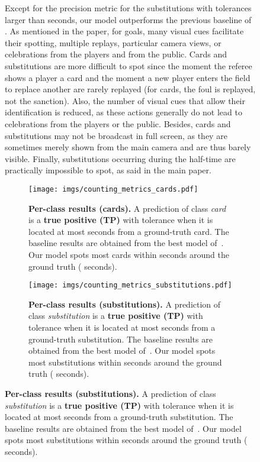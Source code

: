 \documentclass[10pt,twocolumn,letterpaper]{article}
\begin{document}
\begin{figure}[t]
{\begin{minipage}{\linewidth}
Except for the precision metric for the substitutions with tolerances larger than  seconds, our model outperforms the previous baseline of \SoccerNet. As mentioned in the paper, for goals, many visual cues facilitate their spotting, \eg multiple replays, particular camera views, or celebrations from the players and from the public. Cards and substitutions are more difficult to spot since the moment the referee shows a player a card and the moment a new player enters the field to replace another are rarely replayed (\eg for cards, the foul is replayed, not the sanction). Also, the number of visual cues that allow their identification is reduced, as these actions generally do not lead to celebrations from the players or the public. Besides, cards and substitutions may not be broadcast in full screen, as they are sometimes merely shown from the main camera and are thus barely visible. Finally, substitutions occurring during the half-time are practically impossible to spot, as said in the main paper.

\begin{figure}
    \centering
    \texttt{[image: imgs/counting\_metrics\_cards.pdf]}\\
    \caption{\textbf{Per-class results (cards).} A prediction of class \emph{card} is a {\color{anthoblue}\textbf{true positive (TP)}} with tolerance  when it is located at most  seconds from a ground-truth card. The baseline results are obtained from the best model of~\cite{Giancola_2018_CVPR_Workshops}. Our model spots most cards within  seconds around the ground truth ( seconds). 
    }
    \label{fig:cardmetrics}
\end{figure}
\begin{figure}
    \centering
    \texttt{[image: imgs/counting\_metrics\_substitutions.pdf]}\\
    \caption{\textbf{Per-class results (substitutions).} A prediction of class \emph{substitution} is a {\color{anthoblue}\textbf{true positive (TP)}} with tolerance  when it is located at most  seconds from a ground-truth substitution. The baseline results are obtained from the best model of~\cite{Giancola_2018_CVPR_Workshops}. Our model spots most substitutions within  seconds around the ground truth ( seconds). 
    }
    \label{fig:substitutionmetrics}
\end{figure}










\end{minipage}}
\end{figure}
\end{document}
